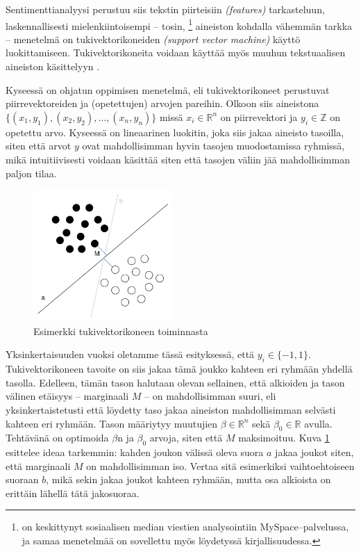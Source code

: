 \documentclass[finnish,gradu,twoside,12pt]{tktltiki}
\begin{document}
{Sentimenttianalyysi perustuu siis tekstin piirteisiin \textit{(features)} tarkasteluun, laskennallisesti mielenkiintoisempi -- tosin, \citet{Thelwall2010}\footnote{\citet{Thelwall2010} on keskittynyt sosiaalisen median viestien analysointiin MySpace--palvelussa, ja samaa menetelmää on sovellettu myös löydetyssä kirjallisuudessa.} aineiston kohdalla vähemmän tarkka -- menetelmä on tukivektorikoneiden \textit{(support vector machine)} käyttö luokittamiseen. Tukivektorikoneita voidaan käyttää myös muuhun tekstuaalisen aineiston käsittelyyn \citep[esimerkiksi][]{Weber2012}.

Kyseessä on ohjatun oppimisen menetelmä, eli tukivektorikoneet perustuvat piirrevektoreiden ja (opetettujen) arvojen pareihin. Olkoon siis aineistona \newline $\{ (x_1, y_1), (x_2, y_2), \ldots , (x_n, y_n) \}$ missä $x_i \in \mathbb{R}^n$ on piirrevektori ja $y_i \in \mathbb{Z}$ on opetettu arvo. Kyseessä on lineaarinen luokitin, joka siis jakaa aineisto tasoilla, siten että arvot $y$ ovat mahdollisimman hyvin tasojen muodostamissa ryhmissä, mikä intuitiivisesti voidaan käsittää siten että tasojen väliin jää mahdollisimman paljon tilaa.

\begin{figure}
\includegraphics[height=5cm]{images/svm.png} 
\caption{Esimerkki tukivektorikoneen toiminnasta}
\label{fig:svm}
\end{figure}

Yksinkertaisuuden vuoksi oletamme tässä esityksessä, että $y_i \in \{ -1, 1 \}$. Tukivektorikoneen tavoite on siis jakaa tämä joukko kahteen eri ryhmään yhdellä tasolla. Edelleen, tämän tason halutaan olevan sellainen, että alkioiden ja tason välinen etäisyys -- marginaali $M$ -- on mahdollisimman suuri, eli yksinkertaistetusti että löydetty taso jakaa aineiston mahdollisimman selvästi kahteen eri ryhmään. Tason määriytyy muutujien $\beta \in \mathbb{R}^n$ sekä $\beta_0 \in \mathbb{R}$ avulla. Tehtävänä on optimoida $\beta$n ja $\beta_0$ arvoja, siten että $M$ maksimoituu. Kuva \ref{fig:svm} esittelee ideaa tarkemmin: kahden joukon välissä oleva suora $a$ jakaa joukot siten, että marginaali $M$ on mahdollisimman iso. Vertaa sitä esimerkiksi vaihtoehtoiseen suoraan $b$, mikä sekin jakaa joukot kahteen ryhmään, mutta osa alkioista on erittäin lähellä tätä jakosuoraa.

}
\end{document}
